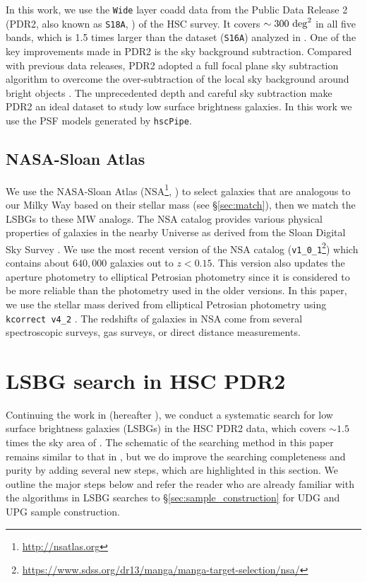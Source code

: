 \documentclass[twocolumn,astrosymb,twocolappendix]{aastex631}
\newcommand{\code}[1]{\texttt{#1}}
\begin{document}
\begin{CJK*}{UTF8}{gbsn}
In this work, we use the \code{Wide} layer coadd data from the Public Data Release 2 (PDR2, also known as \code{S18A}, \citealt{Aihara2018}) of the HSC survey. It covers $\sim 300\ \rm{deg}^2$ in all five bands, which is 1.5 times larger than the dataset (\code{S16A}) analyzed in \citet{Greco2018}. One of the key improvements made in PDR2 is the sky background subtraction. Compared with previous data releases, PDR2 adopted a full focal plane sky subtraction algorithm to overcome the over-subtraction of the local sky background around bright objects \citep{Aihara2018,Li2021}. The unprecedented depth and careful sky subtraction make PDR2 an ideal dataset to study low surface brightness galaxies. In this work we use the PSF models generated by \code{hscPipe}. 


\subsection{NASA-Sloan Atlas}
We use the NASA-Sloan Atlas (NSA\footnote{\url{http://nsatlas.org}}, \citealt{Blanton2005,Blanton2011}) to select galaxies that are analogous to our Milky Way based on their stellar mass (see \S\ref{sec:match}), then we match the LSBGs to these MW analogs. The NSA catalog provides various physical properties of galaxies in the nearby Universe as derived from the Sloan Digital Sky Survey \citep[SDSS,][]{York2000}. We use the most recent version of the NSA catalog (\code{v1\_0\_1}\footnote{\url{https://www.sdss.org/dr13/manga/manga-target-selection/nsa/}}) which contains about $640,000$ galaxies out to $z < 0.15$. This version also updates the aperture photometry to elliptical Petrosian photometry since it is considered to be more reliable than the photometry used in the older versions. In this paper, we use the stellar mass derived from elliptical Petrosian photometry using \code{kcorrect v4\_2} \citep{Blanton2007}. The redshifts of galaxies in NSA come from several spectroscopic surveys,  gas surveys, or direct distance measurements. 

\section{LSBG search in HSC PDR2}\label{sec:lsbg_search}

Continuing the work in \citet{Greco2018} (hereafter ), we conduct a systematic search for low surface brightness galaxies (LSBGs) in the HSC PDR2 data, which covers $\sim 1.5$ times the sky area of . The schematic of the searching method in this paper remains similar to that in , but we do improve the searching completeness and purity by adding several new steps, which are highlighted in this section. We outline the major steps below and refer the reader who are already familiar with the algorithms in LSBG searches to \S \ref{sec:sample_construction} for UDG and UPG sample construction.


\end{CJK*}
\end{document}
